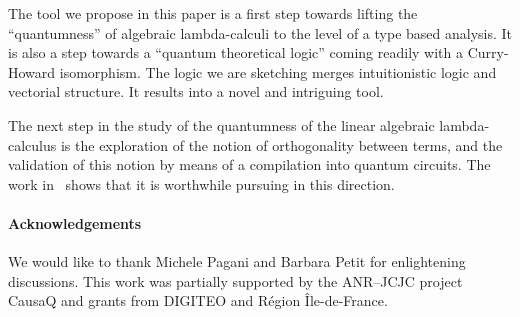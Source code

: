 \documentclass[colorlinks=true,linkcolor=black,urlcolor=black,citecolor=blue,submission,copyright,creativecommons]{eptcs}
\begin{document}
The tool we propose in this paper is a first step towards lifting the ``quantumness'' of algebraic lambda-calculi to the level of a type based analysis. It is also a step
towards a ``quantum theoretical logic'' coming readily with a Curry-Howard
isomorphism. The logic we are sketching merges intuitionistic logic
and vectorial structure. It results into a novel and intriguing tool.

The next step in the study of the quantumness of the linear algebraic
lambda-calculus is the exploration of the notion of orthogonality
between terms, and the validation of this notion by means of a compilation
into quantum circuits. The work in~\cite{ValironQPL10} shows
that it is worthwhile pursuing in this direction.

\paragraph{Acknowledgements}
We would like to thank 
Michele Pagani
and
Barbara Petit
for enlightening discussions.
This work was partially supported by the ANR--JCJC project CausaQ and grants from DIGITEO and Région \^Ile-de-France.
\end{document}
